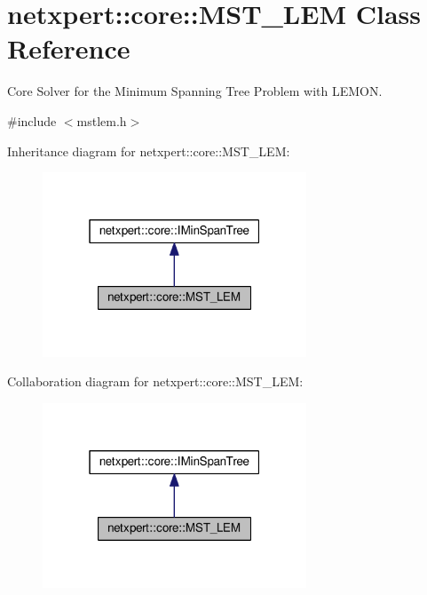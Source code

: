 \hypertarget{classnetxpert_1_1core_1_1MST__LEM}{}\section{netxpert\+:\+:core\+:\+:M\+S\+T\+\_\+\+L\+EM Class Reference}
\label{classnetxpert_1_1core_1_1MST__LEM}


Core Solver for the Minimum Spanning Tree Problem with L\+E\+M\+ON.  




{\ttfamily \#include $<$mstlem.\+h$>$}



Inheritance diagram for netxpert\+:\+:core\+:\+:M\+S\+T\+\_\+\+L\+EM\+:\nopagebreak
\begin{figure}[H]
\begin{center}
\leavevmode
\includegraphics[width=223pt]{classnetxpert_1_1core_1_1MST__LEM__inherit__graph}
\end{center}
\end{figure}


Collaboration diagram for netxpert\+:\+:core\+:\+:M\+S\+T\+\_\+\+L\+EM\+:\nopagebreak
\begin{figure}[H]
\begin{center}
\leavevmode
\includegraphics[width=223pt]{classnetxpert_1_1core_1_1MST__LEM__coll__graph}
\end{center}
\end{figure}
